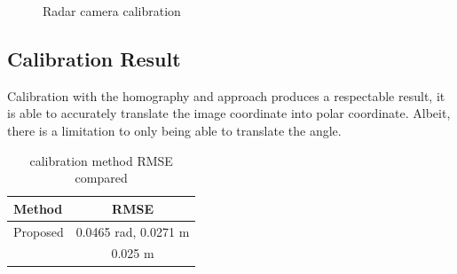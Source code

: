 \begin{figure}[hbpt]
    \caption{Radar camera calibration}
    \label{fig:radar_camera_calibration}
\end{figure}


\newpage
\subsection{Calibration Result}\label{subsec:2-3-calibration-result}
Calibration with the homography and approach produces a respectable result, 
it is able to accurately translate the image coordinate into polar coordinate.
Albeit, there is a limitation to only being able to translate the angle.
\begin{table}[h!]
    \begin{center}
      \label{tab:table4}
      \begin{tabular}{l|c} %
        \textbf{Method} & \textbf{RMSE} \\%
        \hline
        Proposed                            & 0.0465 rad, 0.0271 m \\%
        \citeauthor{8794186}\cite{8794186}  & 0.025 m \\%
      \end{tabular}
    \end{center}
    \caption{calibration method RMSE compared}
    \label{tab:callib_rmse}
  \end{table}


